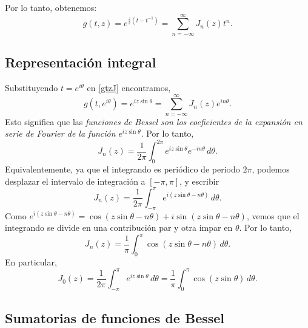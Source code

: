 Por lo tanto, obtenemos:
\begin{equation}\label{gtzJ}
\boxed{g(t,z)=e^{\frac{z}{2}\left(t-t^{-1}\right)}=\sum_{n = -\infty}^\infty J_n(z) t^n.}
\end{equation}

\subsection{Representación integral}
Substituyendo $t=e^{i\theta}$ en \eqref{gtzJ} encontramos,
\begin{equation}\label{gteth}
\boxed{g(t,e^{i\theta})=e^{iz\sin\theta}=\sum_{n = -\infty}^\infty J_n(z) e^{in\theta}.}
\end{equation}
Esto significa que las \textit{funciones de Bessel son los coeficientes de la expansión en serie de Fourier de la función} $e^{iz\sin\theta}$. Por lo tanto,
\begin{equation}
\boxed{J_n(z)=\frac{1}{2\pi}\int_0^{2\pi}e^{iz\sin\theta}e^{-in\theta}\,d\theta.}
\end{equation}
Equivalentemente, ya que el integrando es periódico de periodo $2\pi$, podemos desplazar el intervalo de integración a $[-\pi,\pi]$, y escribir
\begin{equation}
J_n(z)=\frac{1}{2\pi}\int_{-\pi}^{\pi}e^{i(z\sin\theta-n\theta)}\,d\theta.
\end{equation}
Como $e^{i(z\sin\theta-n\theta)}=\cos(z\sin\theta-n\theta)+i\sin(z\sin\theta-n\theta)$, vemos que el integrando se divide en una contribución par y otra impar en $\theta$. Por lo tanto,
\begin{equation}
\boxed{J_n(z)=\frac{1}{\pi}\int_0^{\pi}\cos(z\sin\theta-n\theta)\,d\theta.}
\end{equation}
En particular,
\begin{equation}
\boxed{J_0(z)=\frac{1}{2\pi}\int_{-\pi}^{\pi}e^{iz\sin\theta}\,d\theta=\frac{1}{\pi}\int_0^{\pi}\cos(z\sin\theta)\,d\theta.}
\end{equation}

\subsection{Sumatorias de funciones de Bessel}

